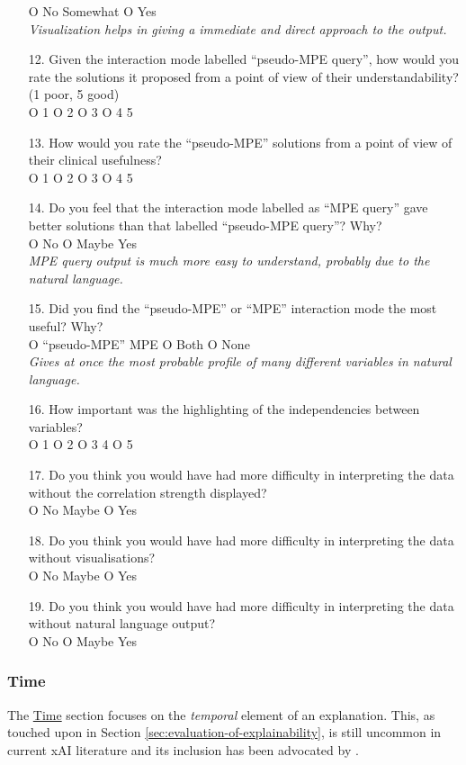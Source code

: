 \begin{mdframed}
\begin{enumerate}[resume]
		O No  Somewhat O Yes\\
		\textit{Visualization helps in giving a immediate and direct approach to the output.}
		\item[12.] Given the interaction mode labelled \enquote{pseudo-MPE query}, how would you rate the solutions it proposed from a point of view of their understandability? (1 poor, 5 good) \\
		O 1 O 2 O 3 O 4  5
		\item[13.] How would you rate the \enquote{pseudo-MPE} solutions from a point of view of their clinical usefulness? \\
		O 1 O 2 O 3 O 4  5
		\item[14.] Do you feel that the interaction mode labelled as \enquote{MPE query} gave better solutions than that labelled \enquote{pseudo-MPE query}?  Why? \\
		O No O Maybe  Yes\\
		\textit{MPE query output is much more easy to understand, probably due to the natural language.}
		\item[15.] Did you find the \enquote{pseudo-MPE} or \enquote{MPE} interaction mode the most useful?  Why? \\
		O \enquote{pseudo-MPE}  MPE O Both O None\\
		\textit{Gives at once the most probable profile of many different variables in natural language.}
		\item[16.] How important was the highlighting of the independencies between variables? \\
		O 1 O 2 O 3  4 O 5
		\item[17.] Do you think you would have had more difficulty in interpreting the data without the correlation strength displayed? \\
		O No  Maybe O Yes
		\item[18.] Do you think you would have had more difficulty in interpreting the data without visualisations? \\
		O No  Maybe O Yes
		\item[19.] Do you think you would have had more difficulty in interpreting the data without natural language output? \\
		O No O Maybe  Yes
	\end{enumerate}
	\label{ques:features}
\end{mdframed}

\subsubsection{Time}
The \hyperref[ques:time]{Time} section focuses on the \textit{temporal} element of an explanation.
This, as touched upon in Section \ref{sec:evaluation-of-explainability}, is still uncommon in current xAI literature and its inclusion has been advocated by \citet{gilpin2018explaining}.

